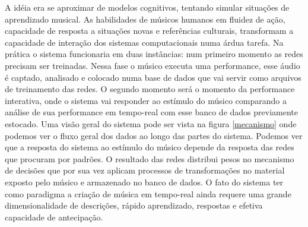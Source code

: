 \documentclass[draft]{ppgmus}
\begin{document}
A idéia era se aproximar de modelos cognitivos, tentando simular situações de aprendizado musical.
As habilidades de músicos humanos em fluidez de ação, capacidade de 
resposta a situações novas e referências culturais, transformam a capacidade de interação dos sistemas computacionais 
numa árdua tarefa. Na prática o sistema funcionaria em duas instâncias: num primeiro momento as redes precisam ser 
treinadas. Nessa fase o músico executa uma performance, esse áudio é captado, analisado e colocado numa base de dados 
que vai servir como arquivos de treinamento das redes. O segundo momento será o momento da performance interativa, 
onde o sistema vai responder ao estímulo do músico comparando a análise de sua performance em tempo-real com esse 
banco de dados previamente estocado. Uma visão geral do sistema pode ser vista na figura \ref{mecanismo} onde podemos ver o fluxo 
geral dos dados ao longo das partes do sistema. Podemos ver que a resposta do sistema ao estímulo do músico depende 
da resposta das redes que procuram por padrões. O resultado das redes distribui pesos no mecanismo de decisões que por 
sua vez aplicam processos de transformações no material exposto pelo músico e armazenado no banco de dados.
   O fato do sistema ter como paradigma a criação de música em tempo-real ainda requere uma grande dimensionalidade de 
descrições, rápido aprendizado, respostas e efetiva capacidade de antecipação. 
\end{document}

